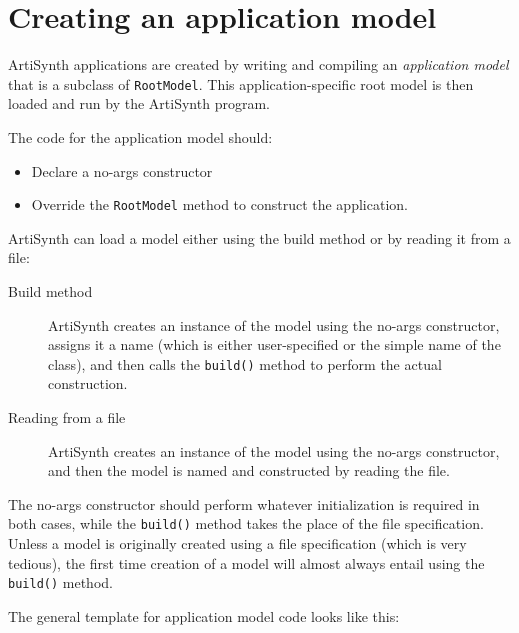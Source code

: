 \section{Creating an application model}
\label{CreatingAnApplication:sec}

ArtiSynth applications are created by writing and compiling
an {\it application model} that is a subclass of {\tt RootModel}.
This application-specific root model is then loaded and run by the
ArtiSynth program.

The code for the application model should:

\begin{itemize}

\item Declare a no-args constructor

\item Override the {\tt RootModel}
method to construct the application.

\end{itemize}

ArtiSynth can load a model either using the build method
or by reading it from a file:

\begin{description}

\item[Build method] \mbox{}

ArtiSynth creates an instance of the
model using the no-args constructor, assigns it a name
(which is either user-specified or the simple name of the class), and
then calls the {\tt build()} method to perform the actual
construction.

\item[Reading from a file] \mbox{}

ArtiSynth creates an instance of the
model using the no-args constructor, and then the model is named
and constructed by reading the file.

\end{description}

The no-args constructor should perform whatever initialization is
required in both cases, while the {\tt build()} method takes the place of the
file specification. Unless a model is originally created using a file
specification (which is very tedious), the first time
creation of a model will almost always entail using the {\tt build()}
method.

The general template for application model code looks like this:

